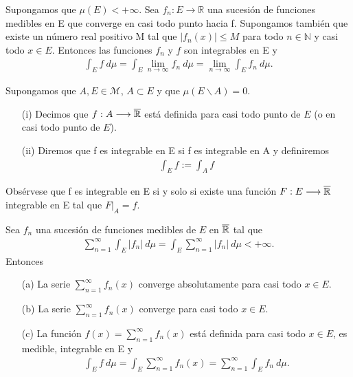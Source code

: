 \begin{cor}
    Supongamos que $\mu(E) < +\infty$. Sea $f_n: E \longrightarrow \mathbb{R}$ una sucesión de funciones medibles en E que converge en casi todo punto hacia f. Supongamos también que existe un número real positivo M tal que $|f_n(x)| \leq M$ para todo $n \in \mathbb{N}$ y casi todo $x \in E$. Entonces las funciones $f_n$ y $f$ son integrables en E y
    \begin{align*}
        \int_{E}{f \ d\mu} = \int_{E}{\lim_{n \to \infty}{f_n \ d\mu}} = \lim_{n \to \infty}{\int_{E}{f_n \ d\mu}}.
    \end{align*}
\end{cor}

\begin{defi}
    Supongamos que $A, E \in \mathcal{M}$, $A \subset E$ y que $\mu(E \backslash A) = 0$.
    \begin{enumerate}
        \item[(i)] Decimos que $f: A \longrightarrow \overline{\mathbb{R}}$ está definida para casi todo punto de $E$ (o en casi todo punto de $E$).
        \item[(ii)]  Diremos que f es integrable en E si f es integrable en A y definiremos
              \begin{align*}
                  \int_{E}{f} := \int_{A}{f}
              \end{align*}
    \end{enumerate}
    Obsérvese que f es integrable en E si y solo si existe una función $F: E \longrightarrow \overline{\mathbb{R}}$ integrable en E tal que $F|_A = f$.
\end{defi}

\begin{cor}
    Sea $f_n$ una sucesión de funciones medibles de $E$ en $\overline{\mathbb{R}}$ tal que
    \begin{align*}
        \sum_{n=1}^{\infty}{\int_{E}{|f_n| \ d\mu}} = \int_{E}{\sum_{n=1}^{\infty}{|f_n|} \ d\mu} < +\infty.
    \end{align*}
    Entonces
    \begin{enumerate}
        \item[(a)] La serie $\sum_{n=1}^{\infty}{f_n(x)}$ converge absolutamente para casi todo $x \in E$.
        \item[(b)] La serie $\sum_{n=1}^{\infty}{f_n(x)}$ converge para casi todo $x \in E$.
        \item[(c)] La función $f(x) = \sum_{n=1}^{\infty}{f_n(x)}$ está definida para casi todo $x \in E$, es medible, integrable en E y
              \begin{align*}
                  \int_{E}{f \ d\mu} = \int_{E}{\sum_{n=1}^{\infty}{f_n(x)}} = \sum_{n=1}^{\infty}{\int_{E}{f_n \ d\mu}}.
              \end{align*}
    \end{enumerate}
\end{cor}

